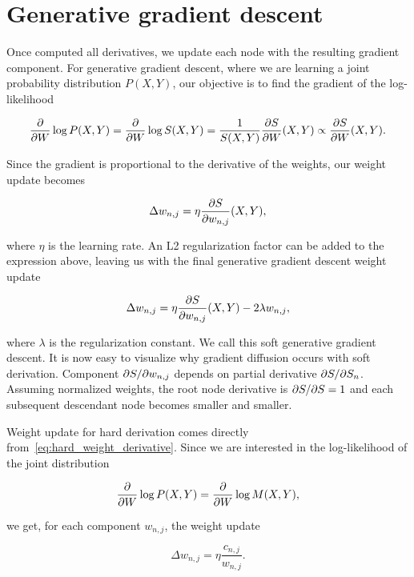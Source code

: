 \section{Generative gradient descent}

Once computed all derivatives, we update each node with the resulting gradient component. For
generative gradient descent, where we are learning a joint probability distribution $P(X,Y)$, our
objective is to find the gradient of the log-likelihood

\begin{equation*}
  \frac{\partial}{\partial W}\log P(X,Y)=\frac{\partial}{\partial W}\log S(X,Y)=\frac{1}{S(X,Y)}\frac{\partial S}{\partial W}(X,Y)\propto
    \frac{\partial S}{\partial W}(X,Y).
\end{equation*}

Since the gradient is proportional to the derivative of the weights, our weight update becomes

\begin{equation*}
  \Delta w_{n,j}=\eta\frac{\partial S}{\partial w_{n,j}}(X, Y),
\end{equation*}

where $\eta$ is the learning rate. An L2 regularization factor can be added to the expression
above, leaving us with the final generative gradient descent weight update

\begin{equation}\label{eq:gen_weight_update}
  \Delta w_{n,j}=\eta\frac{\partial S}{\partial w_{n,j}}(X, Y)-2\lambda w_{n,j},
\end{equation}

where $\lambda$ is the regularization constant. We call this soft generative gradient descent. It
is now easy to visualize why gradient diffusion occurs with soft derivation. Component
$\partial S/\partial w_{n,j}$ depends on partial derivative $\partial S/\partial S_n$. Assuming normalized weights,
the root node derivative is $\partial S/\partial S=1$ and each subsequent descendant node becomes smaller
and smaller.

Weight update for hard derivation comes directly from~\autoref{eq:hard_weight_derivative}. Since we
are interested in the log-likelihood of the joint distribution

\begin{equation*}
  \frac{\partial}{\partial W}\log P(X,Y)=\frac{\partial}{\partial W}\log M(X,Y),
\end{equation*}

we get, for each component $w_{n,j}$, the weight update

\begin{equation*}
  \Delta w_{n,j}=\eta\frac{c_{n,j}}{w_{n,j}}.
\end{equation*}

